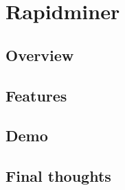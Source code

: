 \chapter{Rapidminer}

\section{Overview}

\section{Features}

\section{Demo}

\section{Final thoughts}